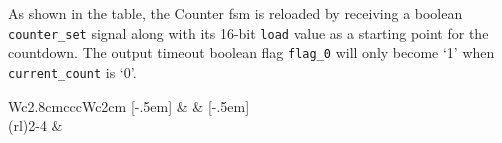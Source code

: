 As shown in the table, the Counter \ac{fsm} is reloaded by receiving a boolean \texttt{counter\_set} signal along with its 16-bit \texttt{load} value as a starting point for the countdown. The output timeout boolean flag \texttt{flag\_0} will only become `1' when \texttt{current\_count} is `0'.
\begin{table}[H]
	\renewcommand{\arraystretch}{1.5}
	\setlength{\tabcolsep}{6pt}
	\setlength{\cmidrulekern}{.4em}
	\centering
	\caption{Counter \acs{fsm} State Assigned Table.\label{tab:pcounter_sat}}
	\begin{threeparttable}
		\begin{tabular}[t]{W{c}{2.8cm}cccW{c}{2cm}}
			\toprule
			[-.5em]{} &  & [-.5em]{}                       \\
			\cmidrule(rl){2-4}
			                                                                        & \footnotesize\ttfamily\makecell{
}
\end{tabular}
\end{threeparttable}
\end{table}
